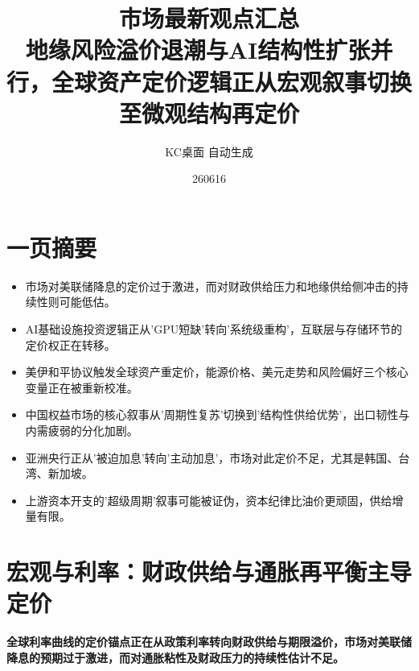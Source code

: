 \documentclass[11pt]{ctexart}
\title{\textbf{市场最新观点汇总}\\[0.4em]{\large 地缘风险溢价退潮与AI结构性扩张并行，全球资产定价逻辑正从宏观叙事切换至微观结构再定价}}
\author{KC桌面 自动生成}
\date{260616}
\begin{document}
\maketitle
\tableofcontents
\newpage
\section{一页摘要}
\begin{itemize}
  \item 市场对美联储降息的定价过于激进，而对财政供给压力和地缘供给侧冲击的持续性则可能低估。
  \item AI基础设施投资逻辑正从'GPU短缺'转向'系统级重构'，互联层与存储环节的定价权正在转移。
  \item 美伊和平协议触发全球资产重定价，能源价格、美元走势和风险偏好三个核心变量正在被重新校准。
  \item 中国权益市场的核心叙事从'周期性复苏'切换到'结构性供给优势'，出口韧性与内需疲弱的分化加剧。
  \item 亚洲央行正从'被迫加息'转向'主动加息'，市场对此定价不足，尤其是韩国、台湾、新加坡。
  \item 上游资本开支的'超级周期'叙事可能被证伪，资本纪律比油价更顽固，供给增量有限。
\end{itemize}
\section{宏观与利率：财政供给与通胀再平衡主导定价}
\textbf{全球利率曲线的定价锚点正在从政策利率转向财政供给与期限溢价，市场对美联储降息的预期过于激进，而对通胀粘性及财政压力的持续性估计不足。}
\end{document}
